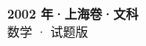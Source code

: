 \documentclass[zihao=-4, a4paper]{ctexart}
\begin{document}
\begin{center}
  {\Large\bfseries 2002 年·上海卷·文科}\\[4pt]
  {\large 数学 · 试题版}
\end{center}
\medskip
{}

\end{document}
